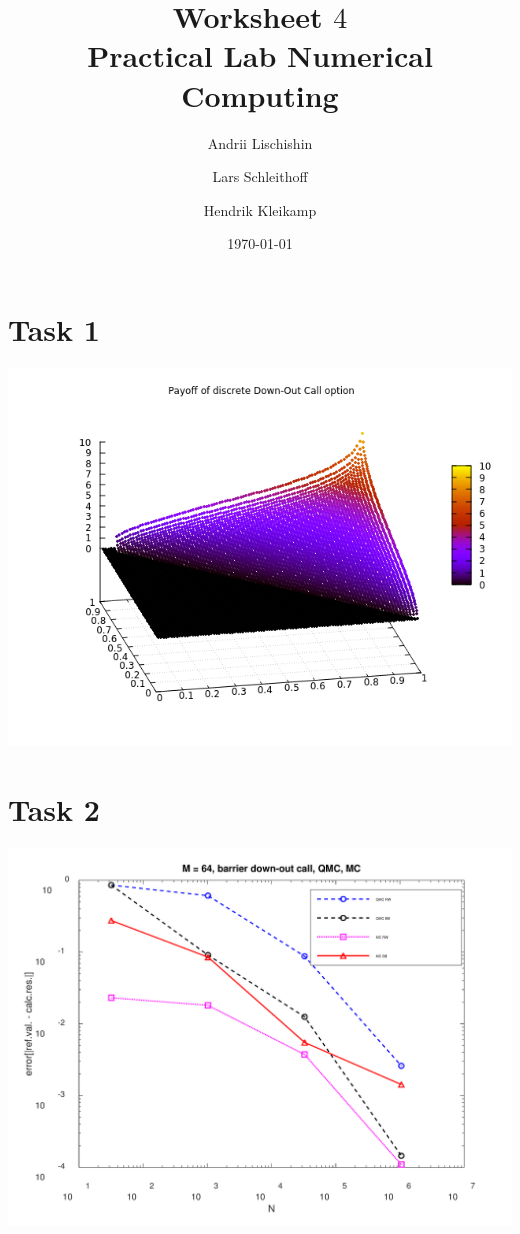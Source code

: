 \documentclass[10pt,a4paper]{article}
\begin{document}
\title{Worksheet $4$\\
\small{Practical Lab Numerical Computing}}
\author{Andrii Lischishin \and Lars Schleithoff \and Hendrik Kleikamp}
\date{\today}
\maketitle

\section*{Task 1}

\begin{center}
	\includegraphics[scale=0.7]{images/payoff_down_out_call.png}
\end{center}

\section*{Task 2}


\begin{center}
	\includegraphics[scale=0.25]{images/task2_error.png}
\end{center}
\end{document}
